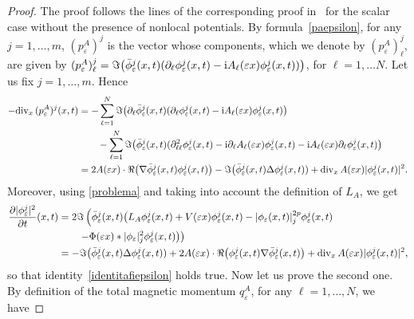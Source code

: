 \documentclass[11pt]{amsart}
\numberwithin{equation}{section}
\theoremstyle{definition}
\begin{document}
\begin{proof}
    The proof follows the lines of the corresponding proof in~\cite{squa}
    for the scalar case without the presence of nonlocal potentials.
By formula~\eqref{paepsilon}, for any $j=1,\dots,m$,  $(p_{\varepsilon}^A)^j$ is the vector whose
components, which we denote by $(p_{\varepsilon}^A)^j_\ell$, are given by
$(p_{\varepsilon}^A)^j_\ell={{\Im}}\big(\bar\phi_{\varepsilon}^j(x,t)(
\partial_\ell\phi_{\varepsilon}^j(x,t)-{{\rm i}} A_\ell({\varepsilon} x)\phi_{\varepsilon}^j(x,t))\big)$, for $\ell=1, \dots N$.
Let us fix $j=1, \dots, m$. Hence
\begin{align*}
-{\rm div}_{x}\,(p_{\varepsilon}^A)^j(x,t)& =-\sum_{\ell=1}^N{{\Im}}\big(\partial_\ell\bar\phi_{\varepsilon}^j(x,t)
(\partial_\ell\phi_{\varepsilon}^j(x,t)-{{\rm i}} A_\ell({\varepsilon} x)\phi_{\varepsilon}^j(x,t)\big)   \\
& \qquad -\sum_{\ell=1}^N{{\Im}}\big(\bar\phi_{\varepsilon}^j(x,t) (
\partial_{\ell\ell}^2\phi_{\varepsilon}^j(x,t)-{{\rm i}} \partial_\ell
A_\ell({\varepsilon} x)\phi_{\varepsilon}^j(x,t)
-{{\rm i}} A_\ell({\varepsilon} x)\partial_\ell\phi_{\varepsilon}^j(x,t)\big) \\
& =2A({\varepsilon}
x)\cdot{{\Re}}\big(\nabla\bar\phi_{\varepsilon}^j(x,t)\phi_{\varepsilon}^j(x,t)\big)
-{{\Im}}\big(\bar\phi_{\varepsilon}^j(x,t)\Delta\phi_{\varepsilon}^j(x,t))+{\rm
div}_x\,A({\varepsilon} x)|\phi_{\varepsilon}^j(x,t)|^2.
\end{align*}
Moreover, using \eqref{problema} and taking into account the
definition of $L_A$, we get
$$\begin{aligned}
\frac{\partial |\phi_{\varepsilon}^j|^{2}}{\partial t}(x,t)& =
2{{\Im}}\left(\bar\phi_{\varepsilon}^j(x,t)
\big(L_A\phi_{\varepsilon}^j(x,t)
+V({\varepsilon} x)\phi_{\varepsilon}^j(x,t)-|\phi_{\varepsilon}(x,t)|^{2p}_j\phi_{\varepsilon}^j(x,t)\right.\\
& \qquad
\left.-\Phi({\varepsilon} x)*|\phi_{\varepsilon}|^2_j\phi_{\varepsilon}^j(x,t)\big)\right)\\
& =-{{\Im}}\big(\bar\phi_{\varepsilon}^j(x,t)\Delta\phi_{\varepsilon}^j(x,t)) +2 A({\varepsilon}
x)\cdot{{\Re}}\big(\phi_{\varepsilon}^j(x,t)\nabla\bar\phi_{\varepsilon}^j(x,t)\big)
+{\rm div}_x\,A({\varepsilon} x)|\phi_{\varepsilon}^j(x,t)|^2,
\end{aligned}$$
so that identity~\eqref{identitafiepsilon} holds true.
Now let us prove the second one. By definition of the total
magnetic momentum $q_{\varepsilon}^A$, for any $\ell=1,\dots, N$, we have

\end{proof}
\end{document}
